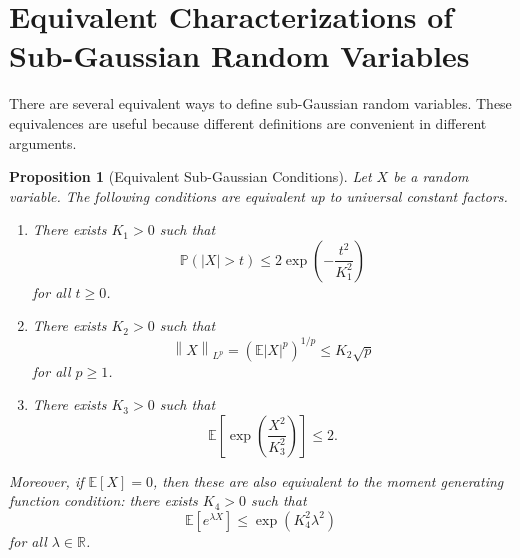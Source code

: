 \documentclass[12pt,oneside]{book}
\numberwithin{equation}{section}
\theoremstyle{definition}
\theoremstyle{plain}
\newtheorem{proposition}{Proposition}[section]
\theoremstyle{remark}
\newcommand{\R}{\mathbb{R}}
\newcommand{\E}{\mathbb{E}}
\newcommand{\Prob}{\mathbb{P}}
\newcommand{\norm}[1]{\left\lVert #1 \right\rVert}
\begin{document}
\section{Equivalent Characterizations of Sub-Gaussian Random Variables}

There are several equivalent ways to define sub-Gaussian random variables. These equivalences are useful because different definitions are convenient in different arguments.

\begin{proposition}[Equivalent Sub-Gaussian Conditions]
Let $X$ be a random variable. The following conditions are equivalent up to universal constant factors.

\begin{enumerate}
\item There exists $K_1>0$ such that
\[
\Prob(|X|>t)
\leq
2\exp\left(
-\frac{t^2}{K_1^2}
\right)
\]
for all $t\geq0$.

\item There exists $K_2>0$ such that
\[
\norm{X}_{L^p}
=
\left(\E|X|^p\right)^{1/p}
\leq
K_2\sqrt{p}
\]
for all $p\geq1$.

\item There exists $K_3>0$ such that
\[
\E\left[
\exp\left(
\frac{X^2}{K_3^2}
\right)
\right]
\leq
2.
\]
\end{enumerate}

Moreover, if $\E[X]=0$, then these are also equivalent to the moment generating function condition: there exists $K_4>0$ such that
\[
\E[e^{\lambda X}]
\leq
\exp(K_4^2\lambda^2)
\]
for all $\lambda\in\R$.
\end{proposition}
\end{document}
